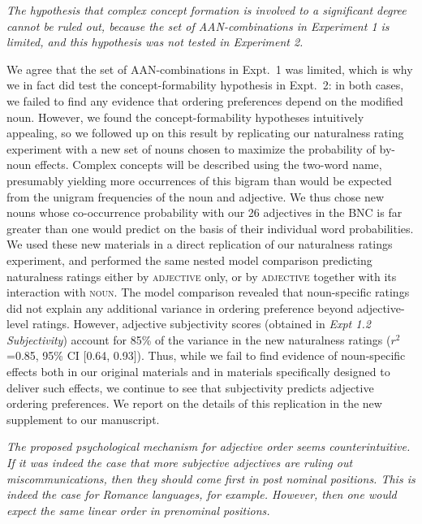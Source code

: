 \documentclass[12pt]{article}
\begin{document}
\item \emph{The hypothesis that complex concept formation is involved to a significant degree cannot be ruled out, because the set of AAN-combinations in Experiment 1 is limited, and this hypothesis was not tested in Experiment 2.}

We agree that the set of AAN-combinations in Expt.~1 was limited, which is why we in fact did test the concept-formability hypothesis in Expt.~2: in both cases, we failed to find any evidence that ordering preferences depend on the modified noun. However, we found the concept-formability hypotheses intuitively appealing, so we followed up on this result by replicating our naturalness rating experiment with a new set of nouns chosen to maximize the probability of by-noun effects.
Complex concepts will be described using the two-word name, presumably yielding more occurrences of this bigram than would be expected from the unigram frequencies of the noun and adjective.
We thus chose new nouns whose co-occurrence probability with our 26 adjectives in the BNC is far greater than one would predict on the basis of their individual word probabilities. 
We used these new materials in a direct replication of our naturalness ratings experiment, and performed the same nested model comparison predicting naturalness ratings either by \textsc{adjective} only, or by \textsc{adjective} together with its interaction with \textsc{noun}. The model comparison revealed that noun-specific ratings did not explain any additional variance in ordering preference beyond adjective-level ratings. However, adjective subjectivity scores (obtained in \emph{Expt 1.2 Subjectivity}) account for  85\% of the variance in the new naturalness ratings ($r^2${=}0.85, 95\% CI [0.64,  0.93]). Thus, while we fail to find evidence of noun-specific effects both in our original materials and in materials specifically designed to deliver such effects, we continue to see that subjectivity predicts adjective ordering preferences. We report on the details of this replication in the new supplement to our manuscript.

\item \emph{The proposed psychological mechanism for adjective order seems counterintuitive. If it was indeed the case that more subjective adjectives are ruling out miscommunications, then they should come first in post nominal positions. This is indeed the case for Romance languages, for example. However, then one would expect the same linear order in prenominal positions.}
\end{document}
